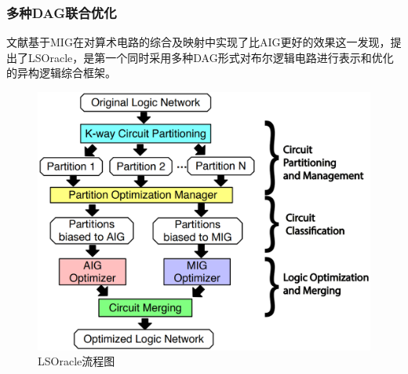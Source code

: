 \subsubsection{多种DAG联合优化}

文献\cite{LS:LSOracle}基于MIG在对算术电路的综合及映射中实现了比AIG更好的效果这一发现，提出了LSOracle，是第一个同时采用多种DAG形式对布尔逻辑电路进行表示和优化的异构逻辑综合框架。

\begin{figure}[!htbp]
    \centering
    \includegraphics[width=0.7\linewidth]{./figs/LS-LSOracle-flow.png}
    \caption{LSOracle流程图}
    \label{LS:LSOracle:Fig:flow}
\end{figure}

